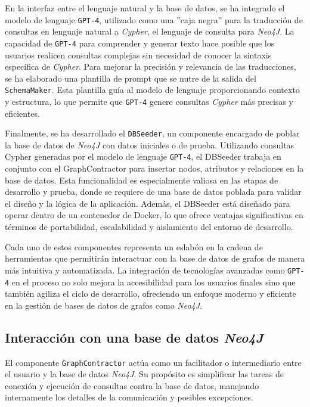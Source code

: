 En la interfaz entre el lenguaje natural y la base de datos, se ha integrado el modelo de lenguaje \texttt{GPT-4}, utilizado como una ''caja negra'' para la traducción de consultas en lenguaje natural a \textit{Cypher}, el lenguaje de consulta para \textit{Neo4J}. La capacidad de \texttt{GPT-4} para comprender y generar texto hace posible que los usuarios realicen consultas complejas sin necesidad de conocer la sintaxis específica de \textit{Cypher}. Para mejorar la precisión y relevancia de las traducciones, se ha elaborado una plantilla de prompt que se nutre de la salida del \texttt{SchemaMaker}. Esta plantilla guía al modelo de lenguaje proporcionando contexto y estructura, lo que permite que \texttt{GPT-4} genere consultas \textit{Cypher} más precisas y eficientes.

Finalmente, se ha desarrollado el \texttt{DBSeeder}, un componente encargado de poblar la base de datos de \textit{Neo4J} con datos iniciales o de prueba. Utilizando consultas Cypher generadas por el modelo de lenguaje \texttt{GPT-4}, el DBSeeder trabaja en conjunto con el GraphContractor para insertar nodos, atributos y relaciones en la base de datos. Esta funcionalidad es especialmente valiosa en las etapas de desarrollo y prueba, donde se requiere de una base de datos poblada para validar el diseño y la lógica de la aplicación. Además, el DBSeeder está diseñado para operar dentro de un contenedor de Docker, lo que ofrece ventajas significativas en términos de portabilidad, escalabilidad y aislamiento del entorno de desarrollo.

Cada uno de estos componentes representa un eslabón en la cadena de herramientas que permitirán interactuar con la base de datos de grafos de manera más intuitiva y automatizada. La integración de tecnologías avanzadas como \texttt{GPT-4} en el proceso no solo mejora la accesibilidad para los usuarios finales sino que también agiliza el ciclo de desarrollo, ofreciendo un enfoque moderno y eficiente en la gestión de bases de datos de grafos como \textit{Neo4J}.

\subsection{Interacción con una base de datos \textit{Neo4J}} \label{graph_contractor}

El componente \texttt{GraphContractor} actúa como un facilitador o intermediario entre el usuario y la base de datos \textit{Neo4J}. Su propósito es simplificar las tareas de conexión y ejecución de consultas contra la base de datos, manejando internamente los detalles de la comunicación y posibles excepciones.

